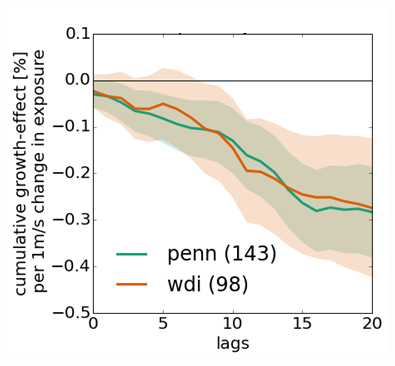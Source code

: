 \documentclass[
c,
11pt,
aspectratio=169, %
final,
]{beamer}
\begin{document}
\begin{frame}
\begin{minipage}[r]{.39\linewidth}
  \vfill
  \includegraphics[width=.75\textwidth]{figures/ind_windspeed}
\end{minipage}
\end{frame}
\end{document}
